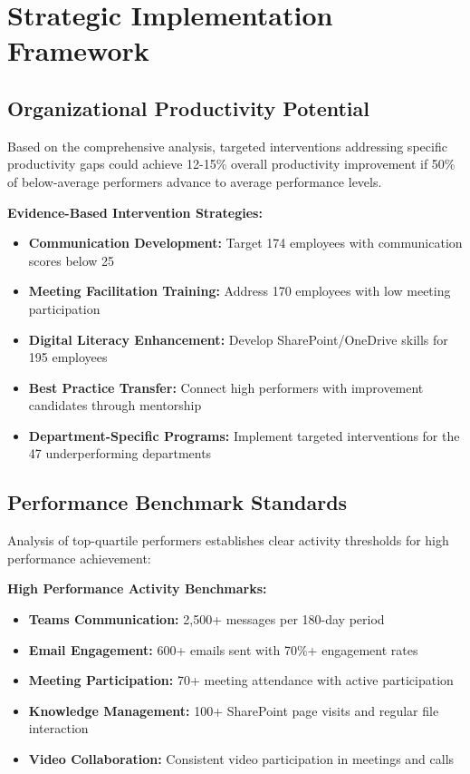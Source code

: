 \documentclass[12pt,a4paper]{article}
\begin{document}
\section{Strategic Implementation Framework}

\subsection{Organizational Productivity Potential}

Based on the comprehensive analysis, targeted interventions addressing specific productivity gaps could achieve 12-15\% overall productivity improvement if 50\% of below-average performers advance to average performance levels.

\begin{highlightbox}
\textbf{\faPlay \quad Evidence-Based Intervention Strategies:}
\begin{itemize}
    \item \textbf{Communication Development:} Target 174 employees with communication scores below 25
    \item \textbf{Meeting Facilitation Training:} Address 170 employees with low meeting participation
    \item \textbf{Digital Literacy Enhancement:} Develop SharePoint/OneDrive skills for 195 employees
    \item \textbf{Best Practice Transfer:} Connect high performers with improvement candidates through mentorship
    \item \textbf{Department-Specific Programs:} Implement targeted interventions for the 47 underperforming departments
\end{itemize}
\end{highlightbox}

\subsection{Performance Benchmark Standards}

Analysis of top-quartile performers establishes clear activity thresholds for high performance achievement:

\begin{featurebox}
\textbf{\faTarget \quad High Performance Activity Benchmarks:}
\begin{itemize}
    \item \textbf{Teams Communication:} 2,500+ messages per 180-day period
    \item \textbf{Email Engagement:} 600+ emails sent with 70\%+ engagement rates
    \item \textbf{Meeting Participation:} 70+ meeting attendance with active participation
    \item \textbf{Knowledge Management:} 100+ SharePoint page visits and regular file interaction
    \item \textbf{Video Collaboration:} Consistent video participation in meetings and calls
\end{itemize}
\end{featurebox}
\end{document}
